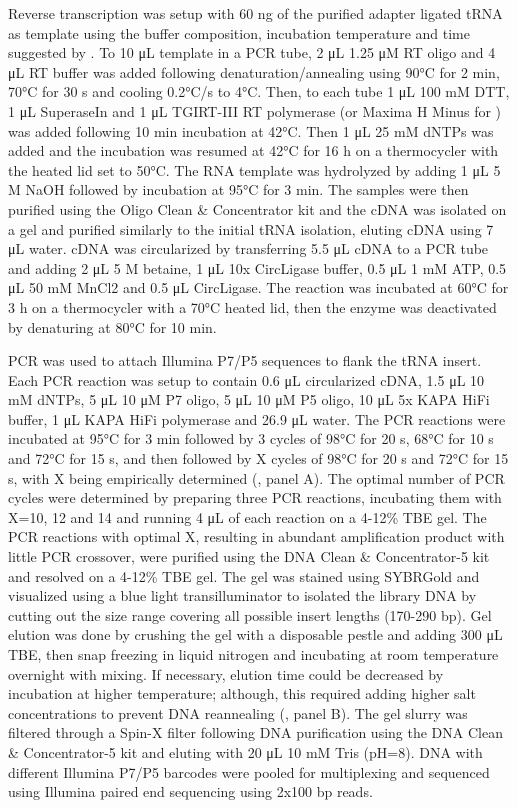 \documentclass[9pt,lineno]{elife}
\begin{document}
Reverse transcription was setup with 60 ng of the purified adapter ligated tRNA as template using the buffer composition, incubation temperature and time suggested by \cite{Behrens2021-gb}.
To 10 μL template in a PCR tube, 2 μL 1.25 μM RT oligo and 4 μL RT buffer was added following denaturation/annealing using 90°C for 2 min, 70°C for 30 s and cooling 0.2°C/s to 4°C.
Then, to each tube 1 μL 100 mM DTT, 1 μL SuperaseIn and 1 μL TGIRT-III RT polymerase (or Maxima H Minus for ) was added following 10 min incubation at 42°C.
Then 1 μL 25 mM dNTPs was added and the incubation was resumed at 42°C for 16 h on a thermocycler with the heated lid set to 50°C.
The RNA template was hydrolyzed by adding 1 μL 5 M NaOH followed by incubation at 95°C for 3 min.
The samples were then purified using the Oligo Clean \& Concentrator kit and the cDNA was isolated on a gel and purified similarly to the initial tRNA isolation, eluting cDNA using 7 μL water.
cDNA was circularized by transferring 5.5 μL cDNA to a PCR tube and adding 2 μL 5 M betaine, 1 μL 10x CircLigase buffer, 0.5 μL 1 mM ATP, 0.5 μL 50 mM MnCl2 and 0.5 μL CircLigase.
The reaction was incubated at 60°C for 3 h on a thermocycler with a 70°C heated lid, then the enzyme was deactivated by denaturing at 80°C for 10 min.

PCR was used to attach Illumina P7/P5 sequences to flank the tRNA insert.
Each PCR reaction was setup to contain 0.6 μL circularized cDNA, 1.5 μL 10 mM dNTPs, 5 μL 10 μM P7 oligo, 5 μL 10 μM P5 oligo, 10 μL 5x KAPA HiFi buffer, 1 μL KAPA HiFi polymerase and 26.9 μL water.
The PCR reactions were incubated at 95°C for 3 min followed by 3 cycles of 98°C for 20 s, 68°C for 10 s and 72°C for 15 s, and then followed by X cycles of 98°C for 20 s and 72°C for 15 s, with X being empirically determined (, panel A).
The optimal number of PCR cycles were determined by preparing three PCR reactions, incubating them with X=10, 12 and 14 and running 4 μL of each reaction on a 4-12\% TBE gel.
The PCR reactions with optimal X, resulting in abundant amplification product with little PCR crossover, were purified using the DNA Clean \& Concentrator-5 kit and resolved on a 4-12\% TBE gel.
The gel was stained using SYBRGold and visualized using a blue light transilluminator to isolated the library DNA by cutting out the size range covering all possible insert lengths (170-290 bp).
Gel elution was done by crushing the gel with a disposable pestle and adding 300 μL TBE, then snap freezing in liquid nitrogen and incubating at room temperature overnight with mixing.
If necessary, elution time could be decreased by incubation at higher temperature; although, this required adding higher salt concentrations to prevent DNA reannealing (, panel B).
The gel slurry was filtered through a Spin-X filter following DNA purification using the DNA Clean \& Concentrator-5 kit and eluting with 20 μL 10 mM Tris (pH=8).
DNA with different Illumina P7/P5 barcodes were pooled for multiplexing and sequenced using Illumina paired end sequencing using 2x100 bp reads.
\end{document}
